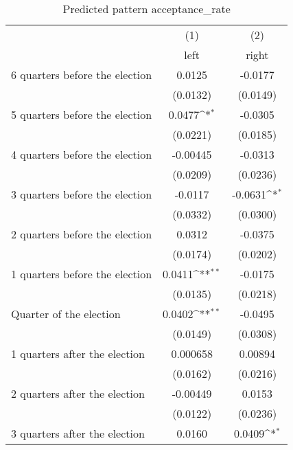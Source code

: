 \begin{table}[htbp]\centering
\def\sym#1{\ifmmode^{#1}\else\(^{#1}\)\fi}
\caption{Predicted pattern acceptance\_rate}
\begin{tabular}{l*{2}{c}}
\hline\hline
                    &\multicolumn{1}{c}{(1)}&\multicolumn{1}{c}{(2)}\\
                    &\multicolumn{1}{c}{left}&\multicolumn{1}{c}{right}\\
\hline
 6 quarters before the election&      0.0125         &     -0.0177         \\
                    &    (0.0132)         &    (0.0149)         \\
[1em]
 5 quarters before the election&      0.0477\sym{*}  &     -0.0305         \\
                    &    (0.0221)         &    (0.0185)         \\
[1em]
 4 quarters before the election&    -0.00445         &     -0.0313         \\
                    &    (0.0209)         &    (0.0236)         \\
[1em]
 3 quarters before the election&     -0.0117         &     -0.0631\sym{*}  \\
                    &    (0.0332)         &    (0.0300)         \\
[1em]
 2 quarters before the election&      0.0312         &     -0.0375         \\
                    &    (0.0174)         &    (0.0202)         \\
[1em]
 1 quarters before the election&      0.0411\sym{**} &     -0.0175         \\
                    &    (0.0135)         &    (0.0218)         \\
[1em]
Quarter of the election&      0.0402\sym{**} &     -0.0495         \\
                    &    (0.0149)         &    (0.0308)         \\
[1em]
 1 quarters after the election&    0.000658         &     0.00894         \\
                    &    (0.0162)         &    (0.0216)         \\
[1em]
 2 quarters after the election&    -0.00449         &      0.0153         \\
                    &    (0.0122)         &    (0.0236)         \\
[1em]
 3 quarters after the election&      0.0160         &      0.0409\sym{*}  \\

\end{tabular}
\end{table}
